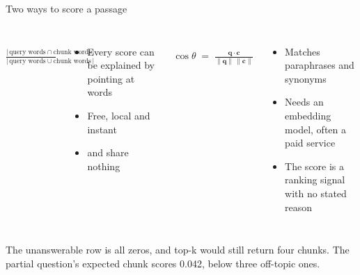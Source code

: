 \begin{frame}{Two ways to score a passage}
  \begin{columns}[T,onlytextwidth]
      \\[2mm]
      $\displaystyle \frac{|\,\text{query words} \cap \text{chunk words}\,|}{|\,\text{query words} \cup \text{chunk words}\,|}$\\[3mm]
      \begin{itemize}\small
        \item Every score can be explained by pointing at words
        \item Free, local and instant
        \item {} and  share nothing
      \end{itemize}
      \\[2mm]
      $\displaystyle \cos\theta \;=\; \frac{\mathbf q\cdot\mathbf c}{\lVert\mathbf q\rVert\,\lVert\mathbf c\rVert}$\\[3mm]
      \begin{itemize}\small
        \item Matches paraphrases and synonyms
        \item Needs an embedding model, often a paid service
        \item The score is a ranking signal with no stated reason
      \end{itemize}
  \end{columns}
  \vspace{2mm}
\end{frame}

  {The unanswerable row is all zeros, and top-k would still return four chunks. The partial question's expected chunk scores 0.042, below three off-topic ones.}

